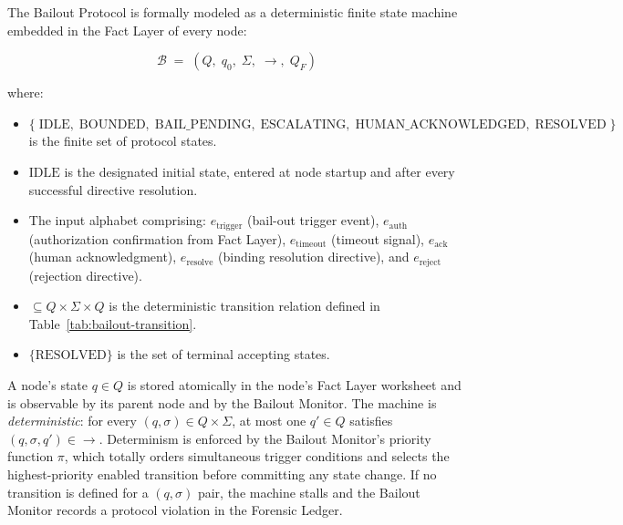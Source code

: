 The Bailout Protocol is formally modeled as a deterministic finite state machine embedded in the Fact Layer of every \bxthree{} node:

\[
\mathcal{B} \;=\; (Q,\; q_0,\; \Sigma,\; \rightarrow,\; Q_F)
\]

where:

\begin{itemize}\itemsep=0pt
\item[$Q$] $\{\; \text{IDLE},\; \text{BOUNDED},\; \text{BAIL\_PENDING},\; \text{ESCALATING},\; \text{HUMAN\_ACKNOWLEDGED},\; \text{RESOLVED}\; \}$ is the finite set of protocol states.
\item[$q_0$] $\text{IDLE}$ is the designated initial state, entered at node startup and after every successful directive resolution.
\item[$\Sigma$] The input alphabet comprising: $e_{\text{trigger}}$ (bail-out trigger event), $e_{\text{auth}}$ (authorization confirmation from Fact Layer), $e_{\text{timeout}}$ (timeout signal), $e_{\text{ack}}$ (human acknowledgment), $e_{\text{resolve}}$ (binding resolution directive), and $e_{\text{reject}}$ (rejection directive).
\item[$\rightarrow$] $\subseteq Q \times \Sigma \times Q$ is the deterministic transition relation defined in Table~\ref{tab:bailout-transition}.
\item[$Q_F$] $\{\text{RESOLVED}\}$ is the set of terminal accepting states.
\end{itemize}

A node's state $q \in Q$ is stored atomically in the node's Fact Layer worksheet and is observable by its parent node and by the Bailout Monitor. The machine is \emph{deterministic}: for every $(q, \sigma) \in Q \times \Sigma$, at most one $q' \in Q$ satisfies $(q, \sigma, q') \in \rightarrow$. Determinism is enforced by the Bailout Monitor's priority function $\pi$, which totally orders simultaneous trigger conditions and selects the highest-priority enabled transition before committing any state change. If no transition is defined for a $(q, \sigma)$ pair, the machine stalls and the Bailout Monitor records a protocol violation in the Forensic Ledger.

